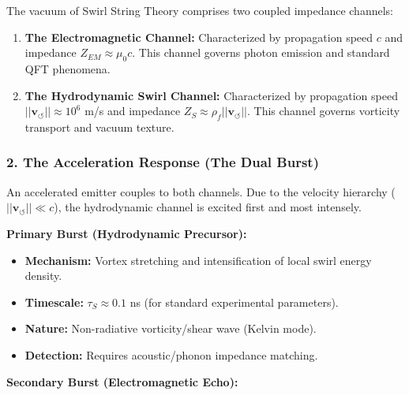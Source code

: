 \documentclass[10pt,reprint,aps,onecolumn,nofootinbib]{revtex4-2}
\begin{document}
            The vacuum of Swirl String Theory comprises two coupled impedance channels:

            \begin{enumerate}
                \item \textbf{The Electromagnetic Channel:} Characterized by propagation speed $c$ and impedance $Z_{EM} \approx \mu_0 c$. This channel governs photon emission and standard QFT phenomena.


                \item \textbf{The Hydrodynamic Swirl Channel:} Characterized by propagation speed $||\mathbf{v}_{\circlearrowleft}|| \approx 10^6$ m/s and impedance $Z_S \approx \rho_{\!f} ||\mathbf{v}_{\circlearrowleft}||$. This channel governs vorticity transport and vacuum texture.


            \end{enumerate}


        \subsubsection*{\textbf{2. The Acceleration Response (The Dual Burst)}}


            An accelerated emitter couples to both channels. Due to the velocity hierarchy ($||\mathbf{v}_{\circlearrowleft}|| \ll c$), the hydrodynamic channel is excited first and most intensely.

            \textbf{Primary Burst (Hydrodynamic Precursor):}

            \begin{itemize}
                \item \textbf{Mechanism:} Vortex stretching and intensification of local swirl energy density.


                \item \textbf{Timescale:} $\tau_S \approx 0.1$ ns (for standard experimental parameters).


                \item \textbf{Nature:} Non-radiative vorticity/shear wave (Kelvin mode).


                \item \textbf{Detection:} Requires acoustic/phonon impedance matching.


            \end{itemize}
            \textbf{Secondary Burst (Electromagnetic Echo):}
\end{document}
